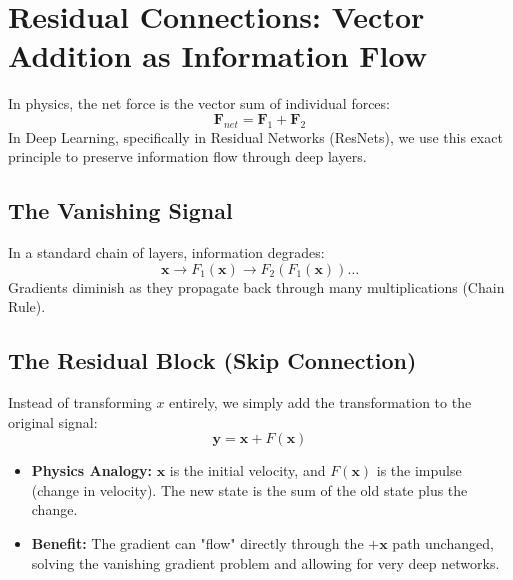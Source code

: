 \documentclass{article}
\begin{document}
\section{Residual Connections: Vector Addition as Information Flow}
In physics, the net force is the vector sum of individual forces:
$$ \mathbf{F}_{net} = \mathbf{F}_1 + \mathbf{F}_2 $$
In Deep Learning, specifically in Residual Networks (ResNets), we use this exact principle to preserve information flow through deep layers.

\subsection{The Vanishing Signal}
In a standard chain of layers, information degrades:
$$ \mathbf{x} \to F_1(\mathbf{x}) \to F_2(F_1(\mathbf{x})) \dots $$
Gradients diminish as they propagate back through many multiplications (Chain Rule).

\subsection{The Residual Block (Skip Connection)}
Instead of transforming $x$ entirely, we simply add the transformation to the original signal:
$$ \mathbf{y} = \mathbf{x} + F(\mathbf{x}) $$
\begin{itemize}
    \item \textbf{Physics Analogy:} $\mathbf{x}$ is the initial velocity, and $F(\mathbf{x})$ is the impulse (change in velocity). The new state is the sum of the old state plus the change.
    \item \textbf{Benefit:} The gradient can "flow" directly through the $+ \mathbf{x}$ path unchanged, solving the vanishing gradient problem and allowing for very deep networks.
\end{itemize}
\end{document}

